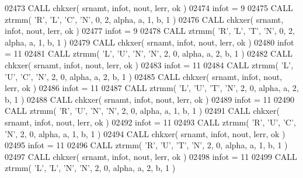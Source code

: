 \begin{DoxyCode}
02473       \textcolor{keyword}{CALL }chkxer( srnamt, infot, nout, lerr, ok )
02474       infot = 9
02475       \textcolor{keyword}{CALL }ztrmm( \textcolor{stringliteral}{'R'}, \textcolor{stringliteral}{'L'}, \textcolor{stringliteral}{'C'}, \textcolor{stringliteral}{'N'}, 0, 2, alpha, a, 1, b, 1 )
02476       \textcolor{keyword}{CALL }chkxer( srnamt, infot, nout, lerr, ok )
02477       infot = 9
02478       \textcolor{keyword}{CALL }ztrmm( \textcolor{stringliteral}{'R'}, \textcolor{stringliteral}{'L'}, \textcolor{stringliteral}{'T'}, \textcolor{stringliteral}{'N'}, 0, 2, alpha, a, 1, b, 1 )
02479       \textcolor{keyword}{CALL }chkxer( srnamt, infot, nout, lerr, ok )
02480       infot = 11
02481       \textcolor{keyword}{CALL }ztrmm( \textcolor{stringliteral}{'L'}, \textcolor{stringliteral}{'U'}, \textcolor{stringliteral}{'N'}, \textcolor{stringliteral}{'N'}, 2, 0, alpha, a, 2, b, 1 )
02482       \textcolor{keyword}{CALL }chkxer( srnamt, infot, nout, lerr, ok )
02483       infot = 11
02484       \textcolor{keyword}{CALL }ztrmm( \textcolor{stringliteral}{'L'}, \textcolor{stringliteral}{'U'}, \textcolor{stringliteral}{'C'}, \textcolor{stringliteral}{'N'}, 2, 0, alpha, a, 2, b, 1 )
02485       \textcolor{keyword}{CALL }chkxer( srnamt, infot, nout, lerr, ok )
02486       infot = 11
02487       \textcolor{keyword}{CALL }ztrmm( \textcolor{stringliteral}{'L'}, \textcolor{stringliteral}{'U'}, \textcolor{stringliteral}{'T'}, \textcolor{stringliteral}{'N'}, 2, 0, alpha, a, 2, b, 1 )
02488       \textcolor{keyword}{CALL }chkxer( srnamt, infot, nout, lerr, ok )
02489       infot = 11
02490       \textcolor{keyword}{CALL }ztrmm( \textcolor{stringliteral}{'R'}, \textcolor{stringliteral}{'U'}, \textcolor{stringliteral}{'N'}, \textcolor{stringliteral}{'N'}, 2, 0, alpha, a, 1, b, 1 )
02491       \textcolor{keyword}{CALL }chkxer( srnamt, infot, nout, lerr, ok )
02492       infot = 11
02493       \textcolor{keyword}{CALL }ztrmm( \textcolor{stringliteral}{'R'}, \textcolor{stringliteral}{'U'}, \textcolor{stringliteral}{'C'}, \textcolor{stringliteral}{'N'}, 2, 0, alpha, a, 1, b, 1 )
02494       \textcolor{keyword}{CALL }chkxer( srnamt, infot, nout, lerr, ok )
02495       infot = 11
02496       \textcolor{keyword}{CALL }ztrmm( \textcolor{stringliteral}{'R'}, \textcolor{stringliteral}{'U'}, \textcolor{stringliteral}{'T'}, \textcolor{stringliteral}{'N'}, 2, 0, alpha, a, 1, b, 1 )
02497       \textcolor{keyword}{CALL }chkxer( srnamt, infot, nout, lerr, ok )
02498       infot = 11
02499       \textcolor{keyword}{CALL }ztrmm( \textcolor{stringliteral}{'L'}, \textcolor{stringliteral}{'L'}, \textcolor{stringliteral}{'N'}, \textcolor{stringliteral}{'N'}, 2, 0, alpha, a, 2, b, 1 )

\end{DoxyCode}
